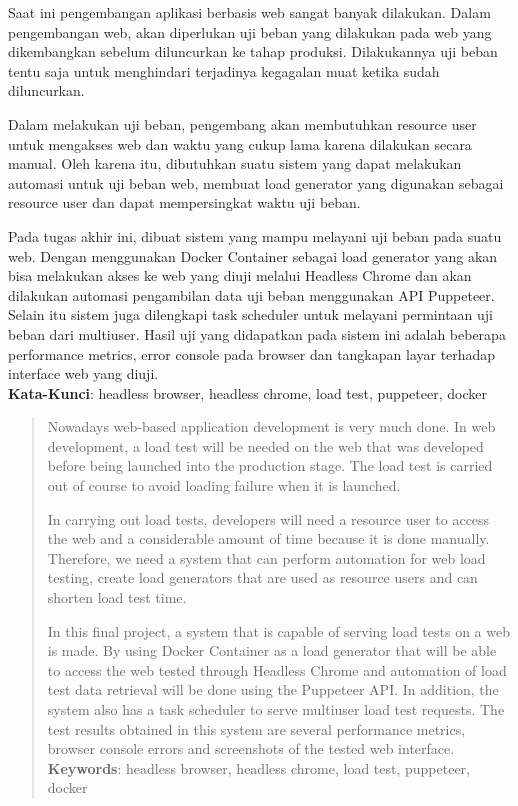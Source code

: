 \begin{abstrak}
		Saat ini pengembangan aplikasi berbasis web sangat banyak dilakukan. Dalam pengembangan web, akan diperlukan uji beban yang dilakukan pada web yang dikembangkan sebelum diluncurkan ke tahap produksi. Dilakukannya uji beban tentu saja untuk menghindari terjadinya kegagalan muat ketika sudah diluncurkan.

		\indent Dalam melakukan uji beban, pengembang akan membutuhkan resource user untuk mengakses web dan waktu yang cukup lama karena dilakukan secara manual. Oleh karena itu, dibutuhkan suatu sistem yang dapat melakukan automasi untuk uji beban web, membuat load generator yang digunakan sebagai resource user dan dapat mempersingkat waktu uji beban.
		
		\indent Pada tugas akhir ini, dibuat sistem yang mampu melayani uji beban pada suatu web. Dengan menggunakan Docker Container sebagai load generator yang akan bisa melakukan akses ke web yang diuji melalui Headless Chrome dan akan dilakukan automasi pengambilan data uji beban menggunakan API Puppeteer. Selain itu sistem juga dilengkapi task scheduler untuk melayani permintaan uji beban dari multiuser. Hasil uji yang didapatkan pada sistem ini adalah beberapa performance metrics, error console pada browser dan tangkapan layar terhadap interface web yang diuji. \\

	\noindent \textbf{Kata-Kunci}: headless browser, headless chrome, load test, puppeteer, docker
\end{abstrak}
\newpage
\begin{abstract}
		Nowadays web-based application development is very much done. In web development, a load test will be needed on the web that was developed before being launched into the production stage. The load test is carried out of course to avoid loading failure when it is launched.
		
		\indent In carrying out load tests, developers will need a resource user to access the web and a considerable amount of time because it is done manually. Therefore, we need a system that can perform automation for web load testing, create load generators that are used as resource users and can shorten load test time.
		
		\indent In this final project, a system that is capable of serving load tests on a web is made. By using Docker Container as a load generator that will be able to access the web tested through Headless Chrome and automation of load test data retrieval will be done using the Puppeteer API. In addition, the system also has a task scheduler to serve multiuser load test requests. The test results obtained in this system are several performance metrics, browser console errors and screenshots of the tested web interface. \\

	\noindent \textbf{Keywords}: headless browser, headless chrome, load test, puppeteer, docker
\end{abstract}